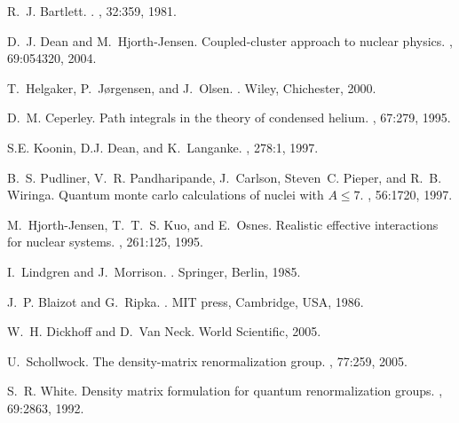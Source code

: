 \documentclass[aps,pra,twocolumn,floatfix]{revtex4}
\begin{document}
%

\begin{thebibliography}{100}



R.~J. Bartlett.
.
, 32:359, 1981.

D.~J. Dean and M.~Hjorth-Jensen.
\newblock Coupled-cluster approach to nuclear physics.
, 69:054320, 2004.

T.~Helgaker, P.~J{\o}rgensen, and J.~Olsen.
.
\newblock Wiley, Chichester, 2000.

D.~M. Ceperley.
\newblock Path integrals in the theory of condensed helium.
, 67:279, 1995.

S.E. Koonin, D.J. Dean, and K.~Langanke.
, 278:1, 1997.

B.~S. Pudliner, V.~R. Pandharipande, J.~Carlson, Steven~C. Pieper, and R.~B.
  Wiringa.
\newblock Quantum monte carlo calculations of nuclei with $A \le 7$.
, 56:1720, 1997.


M.~Hjorth-Jensen, T.~T.~S. Kuo, and E.~Osnes.
\newblock Realistic effective interactions for nuclear systems.
, 261:125, 1995.

I.~Lindgren and J.~Morrison.
.
\newblock Springer, Berlin, 1985.

J.~P. Blaizot and G.~Ripka.
.
\newblock MIT press, Cambridge, USA, 1986.

W.~H. Dickhoff and D.~Van Neck.
\newblock World Scientific, 2005.


U.~Schollwock.
\newblock The density-matrix renormalization group.
, 77:259, 2005.

S.~R. White.
\newblock Density matrix formulation for quantum renormalization groups.
, 69:2863, 1992.


\end{thebibliography}
\end{document}
